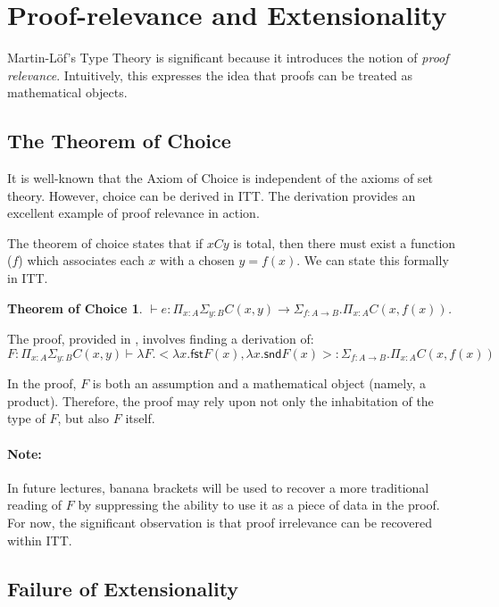 \documentclass[12pt]{article}
\newtheorem*{toc}{Theorem of Choice}
\begin{document}
\section{Proof-relevance and Extensionality}\label{sec:extensionality}

Martin-L\"{o}f's Type Theory is significant because it introduces the notion of
\emph{proof relevance}.  Intuitively, this expresses the idea that proofs can be
treated as mathematical objects.

\subsection{The Theorem of Choice}

It is well-known that the Axiom of Choice is independent of the axioms of 
set theory.  However, choice can be derived in ITT.  The derivation provides an 
excellent example of proof relevance in action.

The theorem of choice
states that if $x C y$ is total, then there must exist a function ($f$) which
associates each $x$ with a chosen $y = f(x)$.  We can state this formally
in ITT.

\begin{toc}
$\vdash e : \Pi_{x:A} \Sigma_{y:B} C(x,y) \rightarrow
  \Sigma_{f : A \rightarrow B} . \Pi_{x:A} C(x, f(x))$.
\end{toc}

The proof, provided in \cite{MartinLof73}, involves finding a derivation of:
\begin{equation*}
F :  \Pi_{x:A} \Sigma_{y:B} C(x,y) \vdash \lambda F . <\lambda x . \mathsf{fst} F(x) , \lambda x . \mathsf{snd} F(x)> : \Sigma_{f : A \rightarrow B} . \Pi_{x:A} C(x, f(x))
\end{equation*}

In the proof, $F$ is both an assumption and a mathematical object (namely, a product).
Therefore, the proof may rely upon not only the inhabitation of the type of $F$, but
also $F$ itself.

\paragraph{Note:} In future lectures, banana brackets will be used to recover
a more traditional reading of $F$ by suppressing the ability to use it as a piece
of data in the proof.  For now, the significant observation is that proof
irrelevance can be recovered within ITT.

\subsection{Failure of Extensionality}
\end{document}
